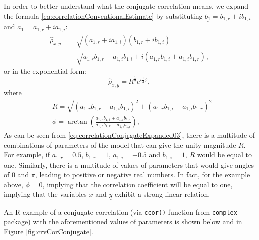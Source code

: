 \documentclass[
]{book}
\begin{document}
In order to better understand what the conjugate correlation means, we expand the formula \eqref{eq:correlationConventionalEstimate} by substituting \(\underline{b_1} = b_{1,r} + i b_{1,i}\) and \(\underline{a_1} = a_{1,r} + i a_{1,i}\):
\begin{equation}
    \begin{aligned}
        \hat{\rho}_{x,y} = & \sqrt{(a_{1,r} + i a_{1,i}) (b_{1,r}+ib_{1,i})} = \\
        & \sqrt{a_{1,r} b_{1,r} - a_{1,i} b_{1,i} + i(a_{1,r} b_{1,i} + a_{1,i} b_{1,r})},
    \end{aligned}
    \label{eq:correlationConjugateExpanded01}
\end{equation}
or in the exponential form:
\begin{equation}
    \hat{\rho}_{x,y} = R^{\frac{1}{2}} e^{i \frac{1}{2} \phi} ,
    \label{eq:correlationConjugateExpanded02}
\end{equation}
where
\begin{equation}
    \begin{aligned}
        & R = \sqrt{(a_{1,r} b_{1,r} - a_{1,i} b_{1,i})^2 + (a_{1,r} b_{1,i} + a_{1,i} b_{1,r})^2} \\
        & \phi=\arctan\left(\frac{a_{1,r} b_{1,i} + a_{1,i} b_{1,r}}{a_{1,r} b_{1,r} - a_{1,i} b_{1,i}}\right),
    \end{aligned}
    \label{eq:correlationConjugateExpanded03}
\end{equation}
As can be seen from \eqref{eq:correlationConjugateExpanded03}, there is a multitude of combinations of parameters of the model that can give the unity magnitude \(R\). For example, if \(a_{1,r} = 0.5\), \(b_{1,r} = 1\), \(a_{1,i} = -0.5\) and \(b_{1,i} = 1\), \(R\) would be equal to one. Similarly, there is a multitude of values of parameters that would give angles of \(0\) and \(\pi\), leading to positive or negative real numbers. In fact, for the example above, \(\phi=0\), implying that the correlation coefficient will be equal to one, implying that the variables \(\underline{x}\) and \(\underline{y}\) exhibit a strong linear relation.

An R example of a conjugate correlation (via \texttt{ccor()} function from \texttt{complex} package) with the aforementioned values of parameters is shown below and in Figure \ref{fig:crvCorConjugate}.
\end{document}
